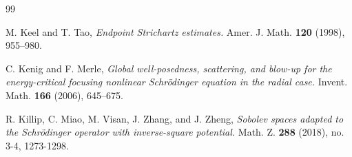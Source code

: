 \documentclass[12pt]{amsart}
\begin{document}
\begin{thebibliography}{99}


%
%

 M. Keel and T. Tao, \emph{Endpoint
Strichartz estimates.} Amer. J. Math. \textbf{120} (1998), 955--980.


 C. Kenig and F. Merle, \emph{Global
well-posedness, scattering, and blow-up for the energy-critical focusing
nonlinear Schr\"{o}dinger equation in the radial case.} Invent. Math.
\textbf{166} (2006), 645--675.



 R. Killip, C. Miao, M. Visan, J. Zhang,
and J. Zheng, \emph{Sobolev spaces adapted to the Schr\"{o}dinger operator
with inverse-square potential.} Math. Z. {\bf 288} (2018), no. 3-4, 1273-1298.


\end{thebibliography}
\end{document}
